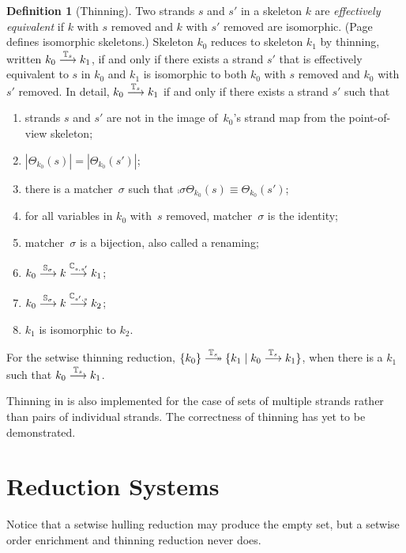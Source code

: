 \documentclass[12pt]{report}
\theoremstyle{definition}
\newtheorem{defn}{Definition}[chapter]
\begin{document}
\begin{defn}[Thinning]\label{def:thinning}
Two strands $s$ and $s'$ in a skeleton $k$ are \emph{effectively
  equivalent} if $k$ with $s$ removed and $k$ with $s'$ removed are
isomorphic.  (Page~\pageref{def:isomorphic preskeletons} defines
isomorphic skeletons.)  Skeleton $k_0$ reduces to skeleton $k_1$ by
thinning, written $k_0\stackrel{\mathbb T_s}{\longrightarrow}k_1$, if and only if there
exists a strand $s'$ that is effectively equivalent to $s$ in $k_0$
and $k_1$ is isomorphic to both $k_0$ with $s$ removed and $k_0$ with
$s'$ removed.  In detail, $k_0\stackrel{\mathbb T_s}{\longrightarrow}k_1$ if and only if
there exists a strand $s'$ such that
\begin{enumerate}
\item strands $s$ and $s'$ are not in the image of~$k_0$'s
  strand map from the point-of-view skeleton;
\item $|\Theta_{k_0}(s)|=|\Theta_{k_0}(s')|$;
\item there is a matcher~$\sigma$ such that
  $\comp{\sigma}{\Theta_{k_0}(s)}\equiv \Theta_{k_0}(s')$;
\item for all variables in $k_0$ with~$s$ removed,
  matcher~$\sigma$ is the identity;
\item matcher~$\sigma$ is a bijection, also called a renaming;
\item $k_0\stackrel{\mathbb S_\sigma}{\longrightarrow}k\stackrel{\mathbb C_{s,s'}}{\longrightarrow}k_1$;
\item $k_0\stackrel{\mathbb S_\sigma}{\longrightarrow}k\stackrel{\mathbb C_{s',s}}{\longrightarrow}k_2$;
\item $k_1$ is isomorphic to $k_2$.
\end{enumerate}

For the setwise thinning reduction,
$\{k_0\}\setreduction{\ops{T}_s}\{k_1\mid
k_0\reduction{\ops{T}_s}k_1\}$, when there is a $k_1$ such that
$k_0\stackrel{\mathbb T_s}{\longrightarrow}k_1$.
\end{defn}

Thinning in {\cpsa} is also implemented for the case of sets of
multiple strands rather than pairs of individual strands.  The
correctness of thinning has yet to be demonstrated.

\section{Reduction Systems}

Notice that a setwise hulling reduction may produce the empty set, but
a setwise order enrichment and thinning reduction never does.
\end{document}

